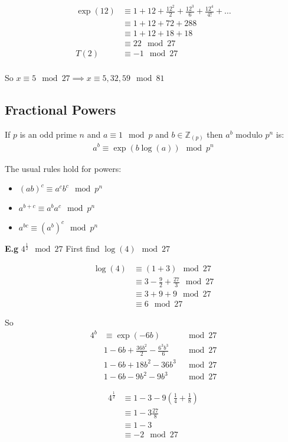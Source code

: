 \documentclass[11pt]{article}
\begin{document}
\begin{align*}
	\exp(12) &\equiv 1 + 12 + \frac{12^2}{2} + \frac{12^3}{6} + \frac{12^4}{4!} + \dots\\
	& \equiv 1 + 12 + 72 + 288\\
	&\equiv 1 + 12+18+18\\
	&\equiv 22 \mod 27\\[1em]
	T(2) &\equiv -1 \mod 27\\
\end{align*}
	
So $x \equiv 5 \mod 27 \implies x \equiv 5,32, 59 \mod 81$

\subsection{Fractional Powers}
	If $p$ is an odd prime $n$ and $a \equiv 1 \mod p$ and $b \in \mathbb{Z}_{(p)} $ then $a^b $ modulo $p^n$ is:
\begin{align*}
	a^b \equiv \exp(b\log(a)) \mod p^n
\end{align*}

The usual rules hold for powers:
\begin{itemize}
	\item{$(ab)^c \equiv a^cb^c \mod p^n$}
	\item{$a^{b+c} \equiv a^b a^c \mod p^n$}
	\item{$a^{bc} \equiv (a^b)^c \mod p^n$}
\end{itemize}
\newpage
\textbf{E.g} $4^{\frac{1}{2}} \mod 27$
First find $\log(4) \mod 27$

\begin{align*}
	\log(4) & \equiv(1+3) \mod 27\\
	& \equiv 3 - \frac{9}{2} + \frac{27}{3} \mod 27\\
	& \equiv 3 + 9 + 9 \mod 27\\
	& \equiv 6 \mod 27
\end{align*}

So 
\begin{align*}
	4^b &\equiv \exp(-6b) &\mod 27\\
	& 1 -6b + \frac{36b^2}{2} - \frac{6^3 b^3}{6} &\mod 27\\
	& 1 -6b + 18b^2 - 36b^3 &\mod 27\\
	& 1-6b - 9b^2-  9b^3 &\mod 27
\end{align*}
	
\begin{align*}
	4^\frac{1}{2} &\equiv 1- 3 - 9(\frac{1}{4} + \frac{1}{8}) \\
	 &\equiv 1-3 \frac{27}{8}\\
	 &\equiv 1-3 \\
	 &\equiv -2 \mod 27
\end{align*}
\end{document}
